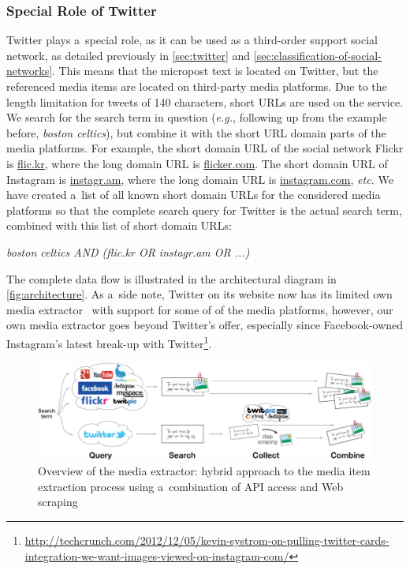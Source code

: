 \subsubsection{Special Role of Twitter}

Twitter plays a~special role, as it can be used as
a third-order support social network,
as detailed previously in
\autoref{sec:twitter}
and \autoref{sec:classification-of-social-networks}.
This means that the micropost text is located on Twitter,
but the referenced media items are located
on third-party media platforms.
Due to the length limitation for tweets of 140 characters,
short URLs are used on the service.
We search for the search term in question (\emph{e.g.},
following up from the example before, \emph{boston celtics}),
but combine it with the short URL domain parts of
the media platforms.
For example, the short domain URL of the social network Flickr
is \url{flic.kr}, where the long domain URL is \url{flicker.com}.
The short domain URL of Instagram is \url{instagr.am},
where the long domain URL is \url{instagram.com}, \emph{etc.}
We have created a~list of all known short domain URLs for the 
considered media platforms so that the complete search query
for Twitter is the actual search term,
combined with this list of short domain URLs:

\emph{boston celtics AND (flic.kr OR instagr.am OR ...)}

\noindent The complete data flow is illustrated in the
architectural diagram in \autoref{fig:architecture}.
As a~side note, Twitter on its website now has its limited own
media extractor~\cite{wang2012twitter}
with support for some of of the media platforms,
however, our own media extractor goes beyond Twitter's offer,
especially since Facebook-owned Instagram's latest break-up with
Twitter\footnote{\url{http://techcrunch.com/2012/12/05/kevin-systrom-on-pulling-twitter-cards-integration-we-want-images-viewed-on-instagram-com/}}.

\begin{figure}
  \centering
  \includegraphics[width=1.0\linewidth]{architecture.pdf}
  \caption[Overview of the media extractor]
    {Overview of the media extractor:
    hybrid approach to the media item extraction process using
    a~combination of API access and Web scraping}
  \label{fig:architecture}
\end{figure}

